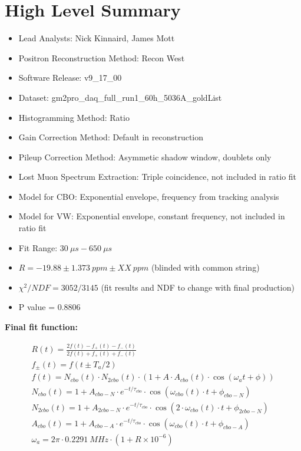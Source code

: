 \chapter*{High Level Summary}

\vspace{5mm}

\begin{itemize}
	\item{Lead Analysts: Nick Kinnaird, James Mott}
	\item{Positron Reconstruction Method: Recon West}
	\item{Software Release: v9\_17\_00}
	\item{Dataset: gm2pro\_daq\_full\_run1\_60h\_5036A\_goldList}
	\item{Histogramming Method: Ratio}
	\item{Gain Correction Method: Default in reconstruction}
	\item{Pileup Correction Method: Asymmetic shadow window, doublets only}
	\item{Lost Muon Spectrum Extraction: Triple coincidence, not included in ratio fit}
	\item{Model for CBO: Exponential envelope, frequency from tracking analysis}
	\item{Model for VW: Exponential envelope, constant frequency, not included in ratio fit}
	\item{Fit Range: $\SI{30}{\mu s} - \SI{650}{\mu s}$}
	\item{$R = -19.88 \pm \SI{1.373}{ppm} \pm XX\SI{}{ppm}$ (blinded with common string)}
	\item{$\chi^{2}/NDF = 3052/3145$} (fit results and NDF to change with final production)
	\item{P value = 0.8806}
\end{itemize}

\textbf{Final fit function:}

\begin{gather*}
		R(t) = \frac{2f(t) - f_{+}(t) - f_{-}(t)}{2f(t) + f_{+}(t) + f_{-}(t)} \\[6pt]
		f_{\pm}(t) = f(t \pm T_{a}/2) \\[6pt]
		f(t) = N_{cbo}(t) \cdot N_{2cbo}(t) \cdot (1 + A \cdot A_{cbo}(t) \cdot \cos(\omega_{a}t + \phi)) \\[6pt]
		N_{cbo}(t) = 1 + A_{cbo-N} \cdot e^{-t/\tau_{cbo}} \cdot \cos(\omega_{cbo}(t) \cdot t + \phi_{cbo-N}) \\[6pt]
		N_{2cbo}(t) = 1 + A_{2cbo-N} \cdot e^{-t/\tau_{cbo}} \cdot \cos(2 \cdot \omega_{cbo}(t) \cdot t + \phi_{2cbo-N}) \\[6pt]
		A_{cbo}(t) = 1 + A_{cbo-A} \cdot e^{-t/\tau_{cbo}} \cdot \cos(\omega_{cbo}(t) \cdot t + \phi_{cbo-A}) \\[6pt]
		\omega_{a} = 2 \pi \cdot \SI{0.2291}{MHz} \cdot (1 + R \times 10^{-6})
\end{gather*}
